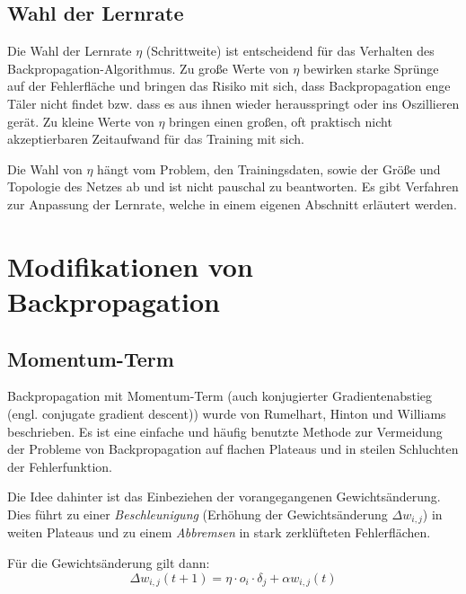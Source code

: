 \subsection*{Wahl der Lernrate}
Die Wahl der Lernrate $\eta$ (Schrittweite) ist entscheidend für das Verhalten des Backpropagation-Algorithmus. Zu große Werte von $\eta$ bewirken starke Sprünge auf der Fehlerfläche und bringen das Risiko mit sich, dass Backpropagation enge Täler nicht findet bzw. dass es aus ihnen wieder herausspringt oder ins Oszillieren gerät.
Zu kleine Werte von $\eta$ bringen einen großen, oft praktisch nicht akzeptierbaren Zeitaufwand für das Training mit sich.

Die Wahl von $\eta$ hängt vom Problem, den Trainingsdaten, sowie der Größe und Topologie des Netzes ab und ist nicht pauschal zu beantworten. Es gibt Verfahren zur Anpassung der Lernrate, welche in einem eigenen Abschnitt erläutert werden.



\section*{Modifikationen von Backpropagation}
\subsection*{Momentum-Term}
Backpropagation mit Momentum-Term (auch konjugierter Gradientenabstieg (engl. conjugate gradient descent)) wurde von Rumelhart, Hinton und Williams beschrieben.
Es ist eine einfache und häufig benutzte Methode zur Vermeidung der Probleme von Backpropagation auf flachen Plateaus und in steilen Schluchten der Fehlerfunktion. 

Die Idee dahinter ist das Einbeziehen der vorangegangenen Gewichtsänderung. Dies führt zu einer \emph{Beschleunigung} (Erhöhung der Gewichtsänderung $\Delta w_{i,j}$) in weiten Plateaus und zu einem \emph{Abbremsen} in stark zerklüfteten Fehlerflächen.

Für die Gewichtsänderung gilt dann:
\[
	\Delta w_{i,j} (t+1) = \eta \cdot o_i \cdot \delta_j + 
		\alpha w_{i,j}(t)
\]

